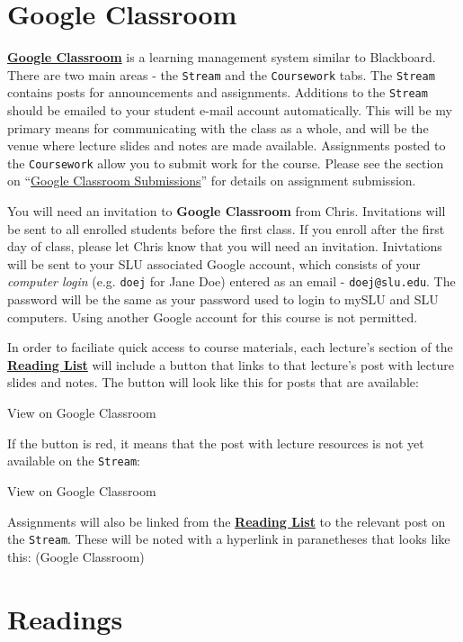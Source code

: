 \documentclass[]{book}
\theoremstyle{definition}
\theoremstyle{definition}
\theoremstyle{definition}
\theoremstyle{remark}
\begin{document}
\hypertarget{google-classroom}{%
\section{Google Classroom}\label{google-classroom}}

\textbf{\href{https://classroom.google.com}{Google Classroom}} is a
learning management system similar to Blackboard. There are two main
areas - the \texttt{Stream} and the \texttt{Coursework} tabs. The
\texttt{Stream} contains posts for announcements and assignments.
Additions to the \texttt{Stream} should be emailed to your student
e-mail account automatically. This will be my primary means for
communicating with the class as a whole, and will be the venue where
lecture slides and notes are made available. Assignments posted to the
\texttt{Coursework} allow you to submit work for the course. Please see
the section on ``\protect\hyperlink{google-classroom-submissions}{Google
Classroom Submissions}'' for details on assignment submission.

You will need an invitation to \textbf{Google Classroom} from Chris.
Invitations will be sent to all enrolled students before the first
class. If you enroll after the first day of class, please let Chris know
that you will need an invitation. Inivtations will be sent to your SLU
associated Google account, which consists of your \emph{computer login}
(e.g. \texttt{doej} for Jane Doe) entered as an email -
\texttt{doej@slu.edu}. The password will be the same as your password
used to login to mySLU and SLU computers. Using another Google account
for this course is not permitted.

In order to faciliate quick access to course materials, each lecture's
section of the \href{/lecture-schedule.html}{\textbf{Reading List}} will
include a button that links to that lecture's post with lecture slides
and notes. The button will look like this for posts that are available:

View on Google Classroom

If the button is red, it means that the post with lecture resources is
not yet available on the \texttt{Stream}:

View on Google Classroom

Assignments will also be linked from the
\href{/lecture-schedule.html}{\textbf{Reading List}} to the relevant
post on the \texttt{Stream}. These will be noted with a hyperlink in
paranetheses that looks like this: (Google Classroom)

\hypertarget{readings}{%
\section{Readings}\label{readings}}
\end{document}
